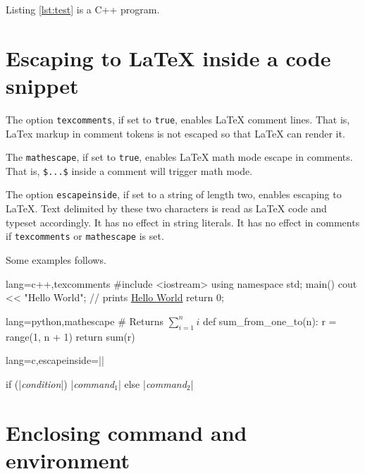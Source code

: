\documentclass[10pt,a4paper]{article}
\begin{document}
\begin{Example}
Listing \ref{lst:test} is a C++ program.
\end{Example}

\section{Escaping to \LaTeX{} inside a code snippet}

The option \verb|texcomments|, if set to \texttt{true}, enables \LaTeX{}
comment lines. That is, LaTex markup in comment tokens is not escaped
so that \LaTeX{} can render it.

The \verb|mathescape|, if set to \texttt{true}, enables \LaTeX{} math
mode escape in comments. That is, \verb|$...$| inside a comment will
trigger math mode.

The option \verb|escapeinside|, if set to a string of length two,
enables escaping to \LaTeX{}. Text delimited by these two characters
is read as \LaTeX{} code and typeset accordingly. It has no effect in
string literals. It has no effect in comments if \verb|texcomments| or
\verb|mathescape| is set.

Some examples follows.

\begin{Example}
\begin{pygmented}{lang=c++,texcomments}
#include <iostream>
using namespace std;
main()
{
cout << "Hello World";  // prints \underline{Hello World}
return 0;
}
\end{pygmented}
\end{Example}

\begin{Example}
\begin{pygmented}{lang=python,mathescape}
# Returns $\sum_{i=1}^{n}i$
def sum_from_one_to(n):
r = range(1, n + 1)
return sum(r)
\end{pygmented}
\end{Example}

\begin{Example}
\begin{pygmented}{lang=c,escapeinside=||}

if (|\textit{condition}|)
|\textit{command$_1$}|
else
|\textit{command$_2$}|
\end{pygmented}
\end{Example}


\section{Enclosing command and environment}
\end{document}
